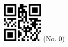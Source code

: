 \documentclass[twocolumn]{article}
\title{}
\date{}
\begin{document}

\begin{center}
 \hspace{0.2cm}
 \includegraphics[width=2cm]{qrcode-0.png}
 \hspace{0.5cm}
 \Large{  (No. 0) }
\end{center}


\end{document}
